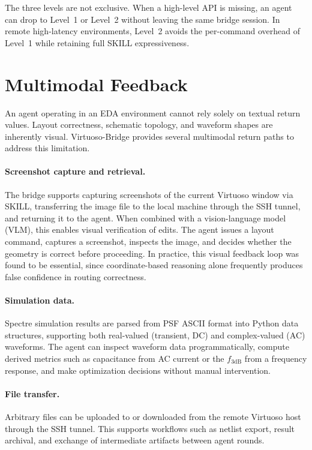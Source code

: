 \documentclass[lettersize,journal]{ieee_template/IEEEtran}
\begin{document}
The three levels are not exclusive. When a high-level API is missing, an agent can drop to Level~1 or Level~2 without leaving the same bridge session. In remote high-latency environments, Level~2 avoids the per-command overhead of Level~1 while retaining full SKILL expressiveness.

\section{Multimodal Feedback}

An agent operating in an EDA environment cannot rely solely on textual return values. Layout correctness, schematic topology, and waveform shapes are inherently visual. Virtuoso-Bridge provides several multimodal return paths to address this limitation.

\paragraph{Screenshot capture and retrieval.} The bridge supports capturing screenshots of the current Virtuoso window via SKILL, transferring the image file to the local machine through the SSH tunnel, and returning it to the agent. When combined with a vision-language model (VLM), this enables visual verification of edits. The agent issues a layout command, captures a screenshot, inspects the image, and decides whether the geometry is correct before proceeding. In practice, this visual feedback loop was found to be essential, since coordinate-based reasoning alone frequently produces false confidence in routing correctness.

\paragraph{Simulation data.} Spectre simulation results are parsed from PSF ASCII format into Python data structures, supporting both real-valued (transient, DC) and complex-valued (AC) waveforms. The agent can inspect waveform data programmatically, compute derived metrics such as capacitance from AC current or the $f_\mathrm{3dB}$ from a frequency response, and make optimization decisions without manual intervention.

\paragraph{File transfer.} Arbitrary files can be uploaded to or downloaded from the remote Virtuoso host through the SSH tunnel. This supports workflows such as netlist export, result archival, and exchange of intermediate artifacts between agent rounds.
\end{document}
